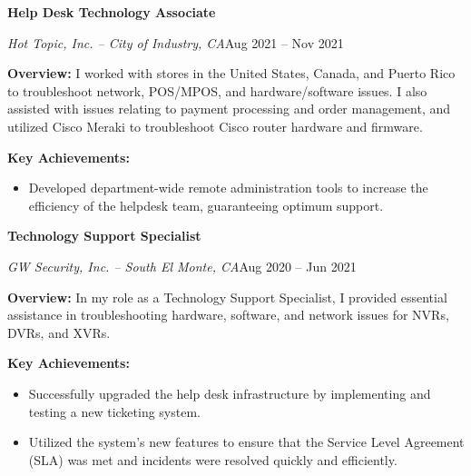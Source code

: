 \documentclass[a4paper]{article}
\begin{document}
\vspace{10pt}
\begin{minipage}{\textwidth}
\textbf{Help Desk Technology Associate}\par
\textit{Hot Topic, Inc. -- City of Industry, CA}\hfill Aug 2021 -- Nov 2021

\medskip
\textbf{Overview:} I worked with stores in the United States, Canada, and Puerto Rico to troubleshoot network, POS/MPOS, and hardware/software issues. I also assisted with issues relating to payment processing and order management, and utilized Cisco Meraki to troubleshoot Cisco router hardware and firmware.

\medskip
\textbf{Key Achievements:}
\begin{itemize}
    \item Developed department-wide remote administration tools to increase the efficiency of the helpdesk team, guaranteeing optimum support.
\end{itemize}
\end{minipage}

\vspace{10pt}
\begin{minipage}{\textwidth}
\textbf{Technology Support Specialist}\par
\textit{GW Security, Inc. -- South El Monte, CA}\hfill Aug 2020 -- Jun 2021

\medskip
\textbf{Overview:} In my role as a Technology Support Specialist, I provided essential assistance in troubleshooting hardware, software, and network issues for NVRs, DVRs, and XVRs.

\medskip
\textbf{Key Achievements:}
\begin{itemize}
    \item Successfully upgraded the help desk infrastructure by implementing and testing a new ticketing system.
    \item Utilized the system's new features to ensure that the Service Level Agreement (SLA) was met and incidents were resolved quickly and efficiently.
\end{itemize}
\end{minipage}
\end{document}
